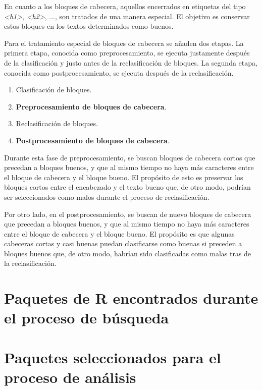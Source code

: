 En cuanto a los bloques de cabecera, aquellos encerrados en etiquetas del tipo \emph{<h1>}, \emph{<h2>}, 
..., son tratados de una manera especial. El objetivo es conservar estos bloques en los textos determinados 
como buenos.

Para el tratamiento especial de bloques de cabecera se añaden dos etapas. La primera etapa, conocida como 
preprocesamiento, se ejecuta justamente después de la clasificación y justo antes de la reclasificación de 
bloques. La segunda etapa, conocida como postprocesamiento, se ejecuta después de la reclasificación.

\begin{enumerate}
  \item Clasificación de bloques.
  \item \textbf{Preprocesamiento de bloques de cabecera}.
  \item Reclasificación de bloques.
  \item \textbf{Postprocesamiento de bloques de cabecera}.
\end{enumerate}

Durante esta fase de preprocesamiento, se buscan bloques de cabecera cortos que precedan a bloques buenos, 
y que al mismo tiempo no haya más caracteres entre el bloque de cabecera y el bloque bueno. El propósito 
de esto es preservar los bloques cortos entre el encabezado y el texto bueno que, de otro modo, podrían 
ser seleccionados como malos durante el proceso de reclasificación.

Por otro lado, en el postprocesamiento, se buscan de nuevo bloques de cabecera que precedan a bloques
buenos, y que al mismo tiempo no haya más caracteres entre el bloque de cabecera y el bloque bueno. El
propósito es que algunas cabeceras cortas y casi buenas puedan clasificarse como buenas si preceden a
bloques buenos que, de otro modo, habrían sido clasificadas como malas tras de la reclasificación.

\section{Paquetes de R encontrados durante el proceso de búsqueda}
\label{sec:paquetes de r encontrados durante el proceso de busqueda}

\section{Paquetes seleccionados para el proceso de análisis}
\label{sec:paquetes seleccionados para el proceso de analisis}
